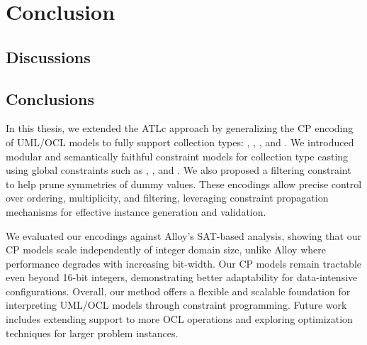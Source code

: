 \chapter*{Conclusion}

\section*{Discussions}


\section*{Conclusions}

In this thesis, we extended the ATLc approach by generalizing the CP encoding of UML/OCL models to fully support collection types: , , , and . We introduced modular and semantically faithful constraint models for collection type casting using global constraints such as , , and . We also proposed a filtering constraint  to help prune symmetries of dummy values. These encodings allow precise control over ordering, multiplicity, and filtering, leveraging constraint propagation mechanisms for effective instance generation and validation.

We evaluated our encodings against Alloy’s SAT-based analysis, showing that our CP models scale independently of integer domain size, unlike Alloy where performance degrades with increasing bit-width. Our CP models remain tractable even beyond 16-bit integers, demonstrating better adaptability for data-intensive configurations. 
Overall, our method offers a flexible and scalable foundation for interpreting UML/OCL models through constraint programming. Future work includes extending support to more OCL operations and exploring optimization techniques for larger problem instances. 




